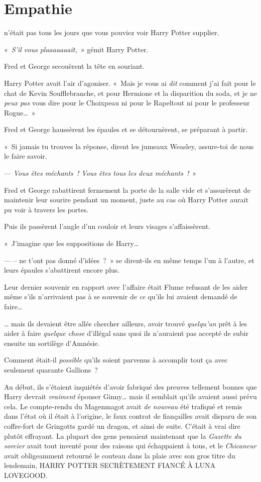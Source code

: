 \chapter{Empathie}

 n'était pas tous les jours que vous pouviez voir Harry Potter supplier.

\hplettrineextrapara
«~\emph{S'il vous plaaaaaaaît,}~» gémit Harry Potter.

Fred et George secouèrent la tête en souriant.

Harry Potter avait l'air d'agoniser.
«~Mais je vous ai \emph{dit} comment j'ai fait pour le chat de Kevin Soufflebranche, et pour Hermione et la disparition du soda, et je ne \emph{peux pas} vous dire pour le Choixpeau ni pour le Rapeltout ni pour le professeur Rogue…~»

Fred et George haussèrent les épaules et se détournèrent, se préparant à partir.

«~Si jamais tu trouves la réponse, dirent les jumeaux Weasley, assure-toi de nous le faire savoir.

--- \emph{Vous êtes méchants~!
Vous êtes tous les deux méchants~!}~»

Fred et George rabattirent fermement la porte de la salle vide et s'assurèrent de maintenir leur sourire pendant un moment, juste au cas où Harry Potter aurait pu voir à travers les portes.

Puis ils passèrent l'angle d'un couloir et leurs visages s'affaissèrent.

«~J'imagine que les suppositions de Harry…

--- -- ne t'ont pas donné d'idées~?~»
se dirent-ils en même temps l'un à l'autre, et leurs épaules s'abattirent encore plus.

Leur dernier souvenir en rapport avec l'affaire était Flume refusant de les aider même s'ils n'arrivaient pas à se souvenir de \emph{ce} qu'ils lui avaient demandé de faire…

… mais ils devaient être allés chercher ailleurs, avoir trouvé \emph{quelqu'un} prêt à les aider à faire \emph{quelque chose} d'illégal sans quoi ils n'auraient pas accepté de subir ensuite un sortilège d'Amnésie.

Comment était-il \emph{possible} qu'ils soient parvenus à accomplir tout ça avec seulement quarante Gallions~?

Au début, ils s'étaient inquiétés d'avoir fabriqué des preuves tellement bonnes que Harry devrait \emph{vraiment} épouser Ginny… mais il semblait qu'ils avaient aussi prévu cela.
Le compte-rendu du Magenmagot avait \emph{de nouveau} été trafiqué et remis dans l'état où il était à l'origine, le faux contrat de fiançailles avait disparu de son coffre-fort de Gringotts gardé un dragon, et ainsi de suite.
C'était à vrai dire plutôt effrayant.
La plupart des gens pensaient maintenant que la \emph{Gazette du sorcier} avait tout inventé pour des raisons qui échappaient à tous, et le \emph{Chicaneur} avait obligeamment retourné le couteau dans la plaie avec son gros titre du lendemain, HARRY POTTER SECRÈTEMENT FIANCÉ À LUNA LOVEGOOD.

